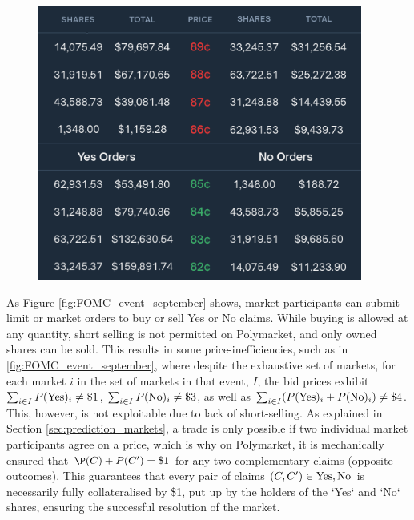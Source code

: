 \begin{figure}[H]
  \begin{center}
    \includegraphics[width=0.95\textwidth]{figures/polymarket_orderbook.png}
  \end{center}
  \label{fig:polymarket_orderbook}
\end{figure}

As Figure \ref{fig:FOMC_event_september} shows, market participants can submit limit or market orders to buy or sell Yes or No claims.
While buying is allowed at any quantity, short selling is not permitted on Polymarket, and only owned shares can be sold.
This results in some price-inefficiencies, such as in \ref{fig:FOMC_event_september}, where despite the exhaustive set of markets, for each market $i$ in the set of markets in that event, $I$, the bid prices exhibit $\sum_{i \in I} P(\text{Yes})_{i} \ne \$1$, $\sum_{i \in I} P(\text{No})_{i} \ne \$3$, as well as $\sum_{i \in I} (P(\text{Yes})_{i} + P(\text{No})_{i}) \ne \$4$. This, however, is not exploitable due to lack of short-selling.
As explained in Section \ref{sec:prediction_markets}, a trade is only possible if two individual market participants agree on a price, which is why on Polymarket, it is mechanically ensured that $\P(C) + P(C') = \$1$ for any two complementary claims (opposite outcomes).
This guarantees that every pair of claims $(C, C') \in {\text{Yes}, \text{No}}$ is necessarily fully collateralised by \$1, put up by the holders of the `Yes` and `No` shares, ensuring the successful resolution of the market. \parencite{PMDocs}

